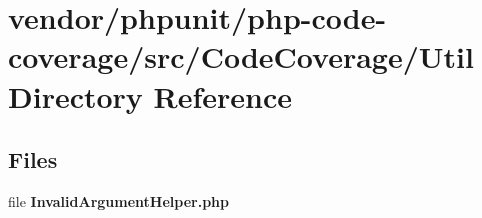 \section{vendor/phpunit/php-\/code-\/coverage/src/\+Code\+Coverage/\+Util Directory Reference}
\label{dir_0ef6f24bdfb885d82c006c6f0aee25aa}
\subsection*{Files}
\begin{DoxyCompactItemize}
\item 
file {\bf Invalid\+Argument\+Helper.\+php}
\end{DoxyCompactItemize}
